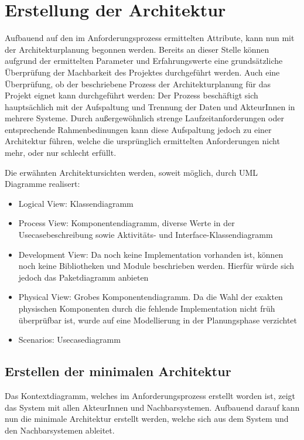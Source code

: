 \chapter{Erstellung der Architektur}
Aufbauend auf den im Anforderungsprozess ermittelten Attribute, kann nun mit der Architekturplanung begonnen werden. Bereits an dieser Stelle können aufgrund der ermittelten Parameter und Erfahrungswerte eine grundsätzliche Überprüfung der Machbarkeit des Projektes durchgeführt werden. Auch eine Überprüfung, ob der beschriebene Prozess der Architekturplanung für das Projekt eignet kann durchgeführt werden: Der Prozess beschäftigt sich hauptsächlich mit der Aufspaltung und Trennung der Daten und AkteurInnen in mehrere Systeme. Durch außergewöhnlich strenge Laufzeitanforderungen oder entsprechende Rahmenbedinungen kann diese Aufspaltung jedoch zu einer Architektur führen, welche die ursprünglich ermittelten Anforderungen nicht mehr, oder nur schlecht erfüllt.

Die erwähnten Architektursichten werden, soweit möglich, durch UML Diagramme realisert:

\begin{itemize}
  \item Logical View: Klassendiagramm
  \item Process View: Komponentendiagramm, diverse Werte in der Usecasebeschreibung sowie Aktivitäts- und Interface-Klassendiagramm
  \item Development View: Da noch keine Implementation vorhanden ist, können noch keine Bibliotheken und Module beschrieben werden. Hierfür würde sich jedoch das Paketdiagramm anbieten
  \item Physical View: Grobes Komponentendiagramm. Da die Wahl der exakten physischen Komponenten durch die fehlende Implementation nicht früh überprüfbar ist, wurde auf eine Modellierung in der Planungsphase verzichtet
  \item Scenarios: Usecasediagramm
\end{itemize}

\section{Erstellen der minimalen Architektur}
Das Kontextdiagramm, welches im Anforderungsprozess erstellt worden ist, zeigt das System mit allen AkteurInnen und Nachbarsystemen. Aufbauend darauf kann nun die minimale Architektur erstellt werden, welche sich aus dem System und den Nachbarsystemen ableitet.

